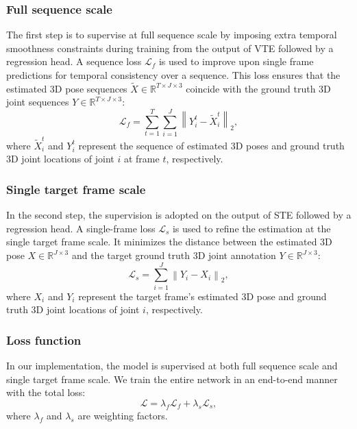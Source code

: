 \documentclass[journal]{IEEEtran}
\begin{document}
\subsubsection{Full sequence scale}
The first step is to supervise at full sequence scale by imposing extra temporal smoothness constraints during training from the output of VTE followed by a regression head. 
A sequence loss $\mathcal{L}_{f}$ is used to improve upon single frame predictions for temporal consistency over a sequence. 
This loss ensures that the estimated 3D pose sequences $\tilde{X} \in \mathbb{R}^{T \times J \times 3}$ coincide with the ground truth 3D joint sequences $Y \in \mathbb{R}^{T \times J \times 3}$: 
\begin{equation}
   \mathcal{L}_{f}=\sum_{t=1}^{T} \sum_{i=1}^{J}\left\|Y_{i}^{t}-\tilde{X}_{i}^{t}\right\|_{2},
\end{equation}
where $\tilde{X}_{i}^{t}$ and $Y_{i}^{t}$ represent the sequence of estimated 3D poses and ground truth 3D joint locations of joint $i$ at frame $t$, respectively. 

\subsubsection{Single target frame scale}
In the second step, the supervision is adopted on the output of STE followed by a regression head. 
A single-frame loss $\mathcal{L}_{s}$ is used to refine the estimation at the single target frame scale. 
It minimizes the distance between the estimated 3D pose $X \in \mathbb{R}^{J \times 3}$ and the target ground truth 3D joint annotation $Y \in \mathbb{R}^{J \times 3}$: 
\begin{equation}
   \mathcal{L}_{s}=\sum_{i=1}^{J}\left\|Y_{i}-X_{i}\right\|_{2},
\end{equation}
where ${X}_{i}$ and $Y_{i}$ represent the target frame's estimated 3D pose and ground truth 3D joint locations of joint $i$, respectively. 

\subsubsection{Loss function}
In our implementation, the model is supervised at both full sequence scale and single target frame scale. 
We train the entire network in an end-to-end manner with the total loss:
\begin{equation}
   \mathcal{L}=\lambda_{f}\mathcal{L}_{f}+\lambda_{s}\mathcal{L}_{s},
\end{equation}
where $\lambda_{f}$ and $\lambda_{s}$ are weighting factors. 
\end{document}
